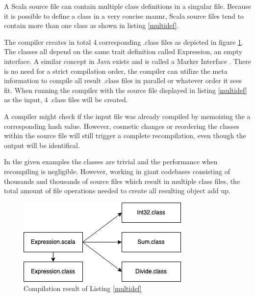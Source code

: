 \documentclass{VUMIFPSbakalaurinis}
\begin{document}

A Scala source file can contain multiple class definitions in a singular file.
Because it is possible to define a class in a very concise mannr, Scala source files tend to contain more than one class as shown in listing \ref{multidef}.




The compiler creates in total 4 corresponding .class files as depicted in figure \ref{img:Expression}.
The classes all depend on the same trait definition called Expression, an empty interface.
A similar concept in Java exists and is called a Marker Interface \cite{10.5555/1407381}.
There is no need for a strict compilation order, the compiler can utilize the meta information to compile all result .class files in parallel or whatever order it sees fit.
When running the compiler with the source file displayed in listing \ref{multidef} as the input, 4 .class files will be created.

A compiler might check if the input file was already compiled by memoizing the a corresponding hash value.
However, cosmetic changes or reordering the classes within the source file will still trigger a complete recompilation, even though the output will be identifical.

In the given examples the classes are trivial and the performance when recompiling is negligible.
However, working in giant codebases consisting of thousands and thousands of source files which result in multiple class files, the total amount of file operations needed to create all resulting object add up.

\begin{figure}[H]
    \centering
    \includegraphics[scale=0.6]{img/Expression}
    \caption{Compilation result of Listing \ref{multidef}}
    \label{img:Expression}
\end{figure}
\end{document}
